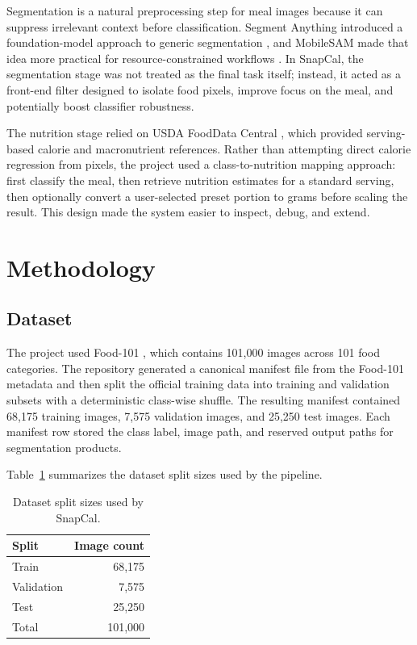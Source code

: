 \documentclass[sigconf,nonacm,11pt]{acmart}
\begin{document}
Segmentation is a natural preprocessing step for meal images because it can suppress irrelevant context before classification. Segment Anything introduced a foundation-model approach to generic segmentation \cite{kirillov2023sam}, and MobileSAM made that idea more practical for resource-constrained workflows \cite{mobilesam2023}. In SnapCal, the segmentation stage was not treated as the final task itself; instead, it acted as a front-end filter designed to isolate food pixels, improve focus on the meal, and potentially boost classifier robustness.

The nutrition stage relied on USDA FoodData Central \cite{usdafdc}, which provided serving-based calorie and macronutrient references. Rather than attempting direct calorie regression from pixels, the project used a class-to-nutrition mapping approach: first classify the meal, then retrieve nutrition estimates for a standard serving, then optionally convert a user-selected preset portion to grams before scaling the result. This design made the system easier to inspect, debug, and extend.

\section{Methodology}

\subsection{Dataset}
The project used Food-101 \cite{bossard2014food101}, which contains 101,000 images across 101 food categories. The repository generated a canonical manifest file from the Food-101 metadata and then split the official training data into training and validation subsets with a deterministic class-wise shuffle. The resulting manifest contained 68,175 training images, 7,575 validation images, and 25,250 test images. Each manifest row stored the class label, image path, and reserved output paths for segmentation products.

Table~\ref{tab:dataset-summary} summarizes the dataset split sizes used by the pipeline.

\begin{table}
  \caption{Dataset split sizes used by SnapCal.}
  \label{tab:dataset-summary}
  \begin{tabular}{lr}
    \toprule
    Split & Image count \\
    \midrule
    Train & 68,175 \\
    Validation & 7,575 \\
    Test & 25,250 \\
    \midrule
    Total & 101,000 \\
    \bottomrule
  \end{tabular}
\end{table}
\end{document}
